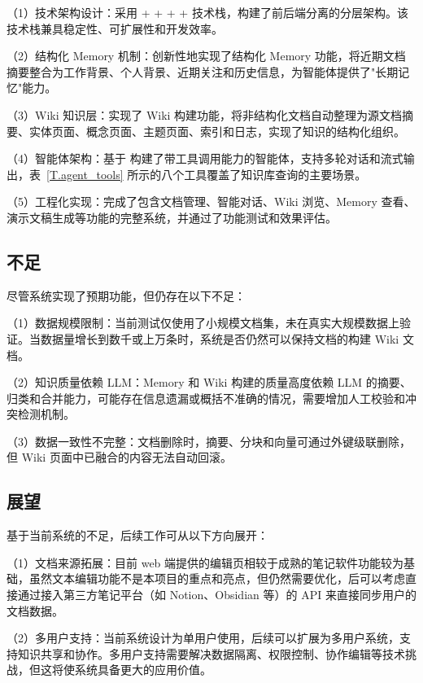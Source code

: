 （1）技术架构设计：采用  +  +  +  +  技术栈，构建了前后端分离的分层架构。该技术栈兼具稳定性、可扩展性和开发效率。

（2）结构化 Memory 机制：创新性地实现了结构化 Memory 功能，将近期文档摘要整合为工作背景、个人背景、近期关注和历史信息，为智能体提供了"长期记忆"能力。

（3）Wiki 知识层：实现了 Wiki 构建功能，将非结构化文档自动整理为源文档摘要、实体页面、概念页面、主题页面、索引和日志，实现了知识的结构化组织。

（4）智能体架构：基于  构建了带工具调用能力的智能体，支持多轮对话和流式输出，表~\ref{T.agent_tools} 所示的八个工具覆盖了知识库查询的主要场景。

（5）工程化实现：完成了包含文档管理、智能对话、Wiki 浏览、Memory 查看、演示文稿生成等功能的完整系统，并通过了功能测试和效果评估。

\subsection{不足}

尽管系统实现了预期功能，但仍存在以下不足：

（1）数据规模限制：当前测试仅使用了小规模文档集，未在真实大规模数据上验证。当数据量增长到数千或上万条时，系统是否仍然可以保持文档的构建 Wiki 文档。

（2）知识质量依赖 LLM：Memory 和 Wiki 构建的质量高度依赖 LLM 的摘要、归类和合并能力，可能存在信息遗漏或概括不准确的情况，需要增加人工校验和冲突检测机制。

（3）数据一致性不完整：文档删除时，摘要、分块和向量可通过外键级联删除，但 Wiki 页面中已融合的内容无法自动回滚。

\subsection{展望}

基于当前系统的不足，后续工作可从以下方向展开：

（1）文档来源拓展：目前 web 端提供的编辑页相较于成熟的笔记软件功能较为基础，虽然文本编辑功能不是本项目的重点和亮点，但仍然需要优化，后可以考虑直接通过接入第三方笔记平台（如 Notion、Obsidian 等）的 API 来直接同步用户的文档数据。

（2）多用户支持：当前系统设计为单用户使用，后续可以扩展为多用户系统，支持知识共享和协作。多用户支持需要解决数据隔离、权限控制、协作编辑等技术挑战，但这将使系统具备更大的应用价值。

\newpage
